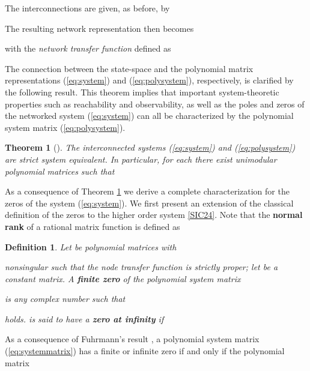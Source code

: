\documentclass[twocolumn]{autart}    \usepackage{amsmath}
\newtheorem{theorem}{Theorem}
\newtheorem{definition}{Definition}
\begin{document}
The interconnections are given, as before, by


The  resulting network representation then becomes
 
with the   {\it network transfer function} defined as



The connection between the state-space and the  polynomial matrix
representations (\ref{eq:system}) and (\ref{eq:polysystem}), respectively,
is clarified by the following result. This theorem implies that important
system-theoretic properties such as reachability and observability, as
well as the poles and zeros of the networked system (\ref{eq:system}) can all  be  characterized by the polynomial
system matrix (\ref{eq:polysystem}).\\

\begin{theorem}[\cite{fuhe2013}]\label{sysequiv}
The interconnected systems (\ref{eq:system}) and (\ref{eq:polysystem})
are strict system equivalent. In particular, for each  there exist unimodular polynomial matrices
 such that

\end{theorem}







As a consequence of Theorem \ref{sysequiv} we derive a complete characterization for the zeros of
the system (\ref{eq:system}). We first present an extension
of the classical
definition of the zeros \cite{kailath} to the higher
order system \eqref{SIC24}. Note that the \textbf{normal rank}  of a rational matrix
function  is defined as



\begin{definition}\label{def:def1}
Let  be polynomial matrices with

nonsingular such that the  node transfer function  is
strictly proper; let  be a constant matrix. A \textbf{finite zero} of the  polynomial system matrix

is any complex number
 such that

holds.    is said to have a  \textbf{zero at infinity} if

\end{definition}




As a consequence of Fuhrmann's result \cite{Fuhrmann1977}, a
 polynomial system matrix (\ref{eq:systemmatrix}) has a finite or
 infinite zero if and only if the polynomial matrix
\end{document}
